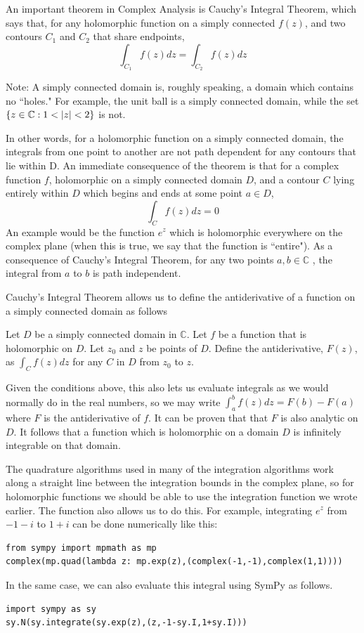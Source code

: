 An important theorem in Complex Analysis is Cauchy's Integral Theorem, which says that, for any holomorphic function on a simply connected  $f(z)$, and two contours $C_1$ and $C_2$ that share endpoints, $$\int_{C_1}f(z)dz = \int_{C_2}f(z)dz$$

Note: A simply connected domain is, roughly speaking, a domain which contains no ``holes." For example, the unit ball is a simply connected domain, while the set $\lbrace z\in \mathbb{C}:1<\left\lvert z\right\rvert<2\rbrace$ is not. 

In other words, for a holomorphic function on a simply connected domain, the integrals from one point to another are not path dependent for any contours that lie within D.
An immediate consequence of the theorem is that for a complex function $f$, holomorphic on a simply connected domain $D$, and a contour $C$ lying entirely within $D$ which begins and ends at some point $a\in D$,
$$\int_C f(z)dz=0$$
An example would be the function $e^z$ which is holomorphic everywhere on the complex plane (when this is true, we say that the function is ``entire").
As a consequence of Cauchy's Integral Theorem, for any two points $a,b\in \mathbb{C}$ , the integral from $a$ to $b$ is path independent.

Cauchy's Integral Theorem allows us to define the antiderivative of a function on a simply connected domain as follows
\begin{theorem}
Let $D$ be a simply connected domain in $\mathbb{C}$. Let $f$ be a function that is holomorphic on $D$.
Let $z_0$ and $z$ be points of $D$. Define the antiderivative, $F(z)$, as $\int_C f(z)dz$ for any $C$ in $D$ from $z_0$ to $z$.
\end{theorem}
Given the conditions above, this also lets us evaluate integrals as we would normally do in the real numbers, so we may write $\int_a^b f(z)dz=F(b)-F(a)$ where $F$ is the antiderivative of $f$.
It can be proven that that $F$ is also analytic on $D$.
It follows that a function which is holomorphic on a domain $D$ is infinitely integrable on that domain.

The quadrature algorithms used in many of the integration algorithms work along a straight line between the integration bounds in the complex plane, so for holomorphic functions we should be able to use the integration function we wrote earlier.
The  function also allows us to do this.
For example, integrating $e^z$ from $-1-i$ to $1+i$ can be done numerically like this:
\begin{lstlisting}
from sympy import mpmath as mp
complex(mp.quad(lambda z: mp.exp(z),(complex(-1,-1),complex(1,1))))
\end{lstlisting}
In the same case, we can also evaluate this integral using SymPy as follows.
\begin{lstlisting}
import sympy as sy
sy.N(sy.integrate(sy.exp(z),(z,-1-sy.I,1+sy.I)))
\end{lstlisting}

